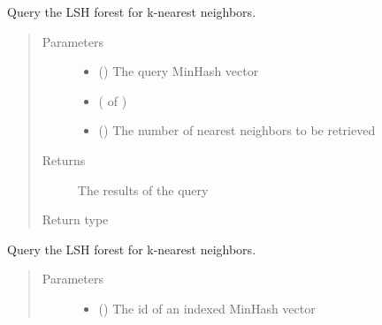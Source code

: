 \documentclass[letterpaper,10pt,english]{sphinxmanual}
\begin{document}
\begin{fulllineitems}

\begin{fulllineitems}
\label{\detokenize{documentation:tmap.LSHForest.query_exclude}}
Query the LSH forest for k-nearest neighbors.
\begin{quote}\begin{description}
\item[{Parameters}] \leavevmode\begin{itemize}
\item {} 
 () \textendash{} The query MinHash vector

\item {} 
 ( of ) \textendash{} 

\item {} 
 () \textendash{} The number of nearest neighbors to be retrieved

\end{itemize}

\item[{Returns}] \leavevmode
The results of the query

\item[{Return type}] \leavevmode
{}

\end{description}\end{quote}

\end{fulllineitems}


\begin{fulllineitems}
\label{\detokenize{documentation:tmap.LSHForest.query_exclude_by_id}}
Query the LSH forest for k-nearest neighbors.
\begin{quote}\begin{description}
\item[{Parameters}] \leavevmode\begin{itemize}
\item {} 
 () \textendash{} The id of an indexed MinHash vector


\end{itemize}
\end{description}
\end{quote}
\end{fulllineitems}
\end{fulllineitems}
\end{document}

